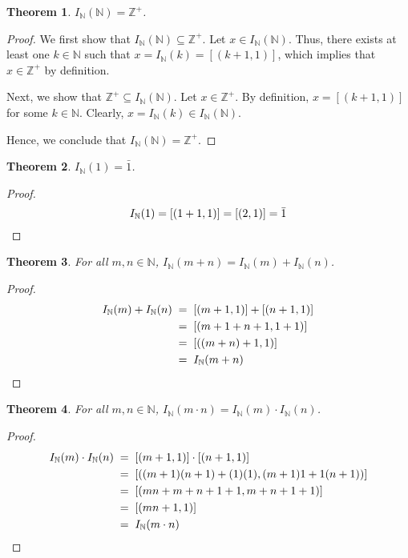 \documentclass[10pt]{article}
\newtheorem{theorem}{Theorem}[section]
\theoremstyle{definition}
\theoremstyle{remark}
\newcommand{\IdN}{I_{\mathbb{N}}}
\begin{document}
        \begin{theorem}
                $\IdN(\mathbb{N}) = \mathbb{Z}^+$.
        \end{theorem}
        \begin{proof}
                We first show that $\IdN(\mathbb{N}) \subseteq \mathbb{Z}^+$.
                Let $x \in \IdN(\mathbb{N})$. Thus, there exists at least one
                $k \in \mathbb{N}$ such that $x = \IdN(k) = [(k + 1, 1)]$, which implies that $x \in \mathbb{Z}^+$ by definition.

                Next, we show that $\mathbb{Z}^+ \subseteq \IdN(\mathbb{N})$.
                Let $x \in \mathbb{Z}^+$. By definition, $x = [(k + 1, 1)]$ for some $k \in \mathbb{N}$. Clearly, $x = \IdN(k) \in \IdN(\mathbb{N})$.

                Hence, we conclude that $\IdN(\mathbb{N}) = \mathbb{Z}^+$.
        \end{proof}

        \begin{theorem}
                $\IdN(1) = \bar{1}$.
        \end{theorem}
        \begin{proof}
                \[\IdN(1) = [(1 + 1, 1)] = [(2, 1)] = \bar{1} \qedhere\]
        \end{proof}

        \begin{theorem}
                For all $m, n \in \mathbb{N}$, $\IdN(m + n) = \IdN(m) + \IdN(n)$.
        \end{theorem}
        \begin{proof}
                \begin{align*}
                        \IdN(m) + \IdN(n) \;&=\; [(m + 1, 1)] + [(n + 1, 1)] \\
                                \;&=\; [(m + 1 + n + 1, 1 + 1)] \\
                                \;&=\; [((m + n) + 1, 1)] \\
                                \;&=\; \IdN(m + n) \qedhere
                \end{align*}
        \end{proof}

        \begin{theorem}
                For all $m, n \in \mathbb{N}$, $\IdN(m \cdot n) = \IdN(m) \cdot \IdN(n)$.
        \end{theorem}
        \begin{proof}
                \begin{align*}
                        \IdN(m) \cdot \IdN(n) \;&=\; [(m + 1, 1)] \cdot [(n + 1, 1)] \\
                                \;&=\; [((m + 1)(n + 1) + (1)(1), (m + 1)1 + 1(n + 1))] \\
                                \;&=\; [(mn + m + n + 1 + 1, m + n + 1 + 1)] \\
                                \;&=\; [(mn + 1, 1)] \\
                                \;&=\; \IdN(m \cdot n) \qedhere
                \end{align*}
        \end{proof}
\end{document}
